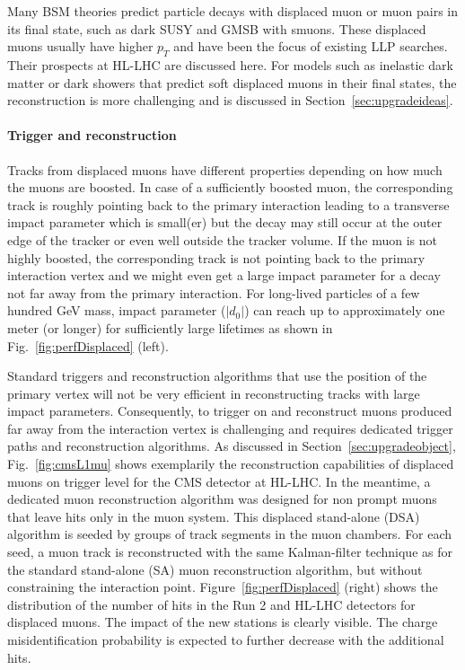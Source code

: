 Many BSM theories predict particle decays with displaced muon or muon pairs in its final state, such as dark SUSY and GMSB with smuons. 
These displaced muons usually have higher $p_T$ and have been the focus of existing LLP searches. 
Their prospects at HL-LHC are discussed here. 
For models such as inelastic dark matter or dark showers that predict soft displaced muons in their final states, the reconstruction is more challenging and is discussed in Section~\ref{sec:upgradeideas}.

\paragraph{Trigger and reconstruction}

Tracks from displaced muons have different properties depending on how much the muons are boosted. 
In case of a sufficiently boosted muon, the corresponding track is roughly pointing back to the primary interaction leading to a transverse impact parameter which is small(er) but the decay may still occur at the outer edge of the tracker or even well outside the tracker volume.
If the muon is not highly boosted, the corresponding track is not pointing back to the primary interaction vertex and we might even get a large impact parameter for a decay not far away from the primary interaction.
For long-lived particles of a few hundred GeV mass, impact parameter ($|d_0|$) can
reach up to approximately one meter (or longer) for sufficiently large
lifetimes as shown in Fig.~\ref{fig:perfDisplaced} (left).

Standard triggers and reconstruction algorithms that use the position of the primary vertex will not be very efficient in reconstructing tracks with large impact parameters.
Consequently, to trigger on and reconstruct muons produced far away from the interaction vertex is challenging and requires dedicated trigger paths and reconstruction algorithms. 
As discussed in Section~\ref{sec:upgradeobject}, Fig.~\ref{fig:cmsL1mu} shows exemplarily the reconstruction capabilities of displaced muons on trigger level for the CMS detector at HL-LHC.
In the meantime, a dedicated muon reconstruction algorithm was designed for non prompt muons that leave hits only in the muon system. 
This displaced stand-alone (DSA) algorithm is seeded by groups of track segments in the muon chambers. For each seed, a muon track is reconstructed with the same Kalman-filter technique as for the standard stand-alone (SA) muon reconstruction algorithm, 
but without constraining the interaction point.
Figure~\ref{fig:perfDisplaced} (right) shows the distribution of the number of hits in the Run 2 and HL-LHC detectors for displaced muons. The impact of the new stations is clearly visible. 
The charge misidentification probability is expected to further decrease with the additional hits.

